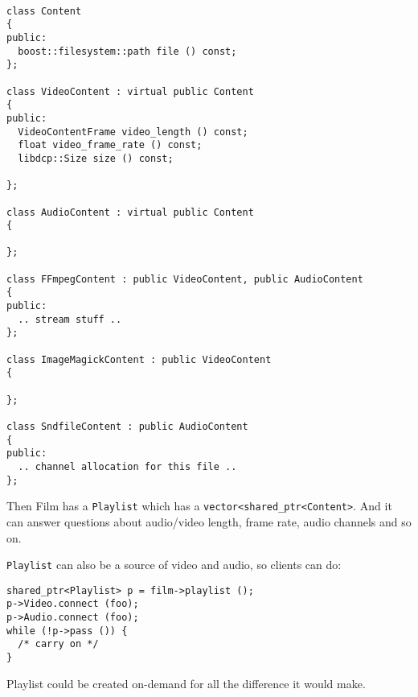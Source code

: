 \documentclass{article}
\begin{document}
\begin{verbatim}

class Content
{
public:
  boost::filesystem::path file () const;
};

class VideoContent : virtual public Content
{
public:
  VideoContentFrame video_length () const;
  float video_frame_rate () const;
  libdcp::Size size () const;

};

class AudioContent : virtual public Content
{

};

class FFmpegContent : public VideoContent, public AudioContent
{
public:
  .. stream stuff ..
};

class ImageMagickContent : public VideoContent
{

};

class SndfileContent : public AudioContent
{
public:
  .. channel allocation for this file ..
};
\end{verbatim}

Then Film has a \texttt{Playlist} which has a
\texttt{vector<shared\_ptr<Content>}.  And it can answer questions
about audio/video length, frame rate, audio channels and so on.

\texttt{Playlist} can also be a source of video and audio, so clients can do:

\begin{verbatim}
shared_ptr<Playlist> p = film->playlist ();
p->Video.connect (foo);
p->Audio.connect (foo);
while (!p->pass ()) {
  /* carry on */
}
\end{verbatim}

Playlist could be created on-demand for all the difference it would make.
\end{document}
